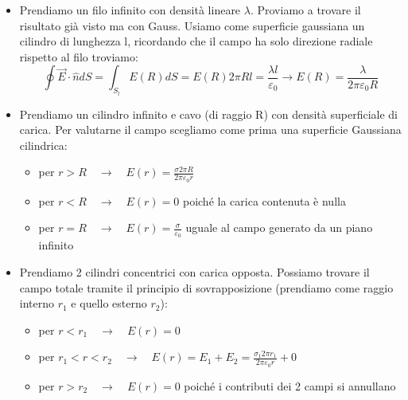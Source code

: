 \documentclass{book}
\begin{document}
\begin{itemize}
Ricordiamo che il campo di una sfera uniformemente carica all'interno è $\vec{E}(\vec{r})= \frac{\rho \vec{r}}{3 \varepsilon_0 }$, usando il principio di sovrapposizione si ha che il campo in un punto generico P è:

$$
\vec{E}(P)= \vec{E}_1(\vec{r_1}) + \vec{E}_2(\vec{r_2}) = \frac{\rho \vec{r}_1}{3 \varepsilon_0 } - 
\frac{\rho \vec{r}_2}{3 \varepsilon_0 } = \frac{\rho}{3 \varepsilon_0} (\vec{r}_1 - \vec{r}_2) = \frac{\rho}{3 \varepsilon_0} \vec{d}
$$
dove $\vec{r_1}$ e $\vec{r_2}$ sono le rispettive distanze del centro delle sfere dal punto P e $\vec{d}$ è la distanza tra i 2 centri delle sfere.
Analizziamo quindi due casi particolari:
\begin{itemize}
    \item in una situazione dove la cavità è simmetrica il campo elettrico all'interno è nullo; in quanto per sfere concentriche $\vec{d}=0$
    \item se intersechiamo 2 sfere identiche e carica opposta (i cui centri distano d), nella zona di intersezione si avrà un campo uniforme:
    $$
    \vec{E}_{int}= \frac{\rho \vec{d}}{3 \varepsilon_0}
    $$
    Mentre all'esterno vedremmo un campo di dipolo elettrico.
\end{itemize}


\item Prendiamo un filo infinito con densità lineare $\lambda$.
Proviamo a trovare il risultato già visto ma con Gauss.
Usiamo come superficie gaussiana un cilindro di lunghezza l, ricordando che il campo ha solo direzione radiale rispetto al filo troviamo:
$$
\oint \vec{E} \cdot \hat{n}dS = \int_{S_{l}} E(R) dS = E(R) 2 \pi Rl = \frac{\lambda l}{\varepsilon_0} \to E(R) = \frac{\lambda}{2 \pi \varepsilon_0 R} $$

\item Prendiamo un cilindro infinito  e cavo (di raggio R) con densità superficiale di carica. 
Per valutarne il campo scegliamo come prima una superficie Gaussiana cilindrica:
\begin{itemize}
    \item per $r > R \quad \to \quad E(r)= \frac{\sigma 2 \pi R}{2 \pi \varepsilon_0 r}  $ 
     \item per $r < R \quad \to \quad E(r)= 0 $ poiché la carica contenuta è nulla
     \item per $r = R \quad \to \quad E(r)= \frac{\sigma}{\varepsilon_0} $ uguale al campo generato da un piano infinito

\end{itemize}
\item Prendiamo 2 cilindri concentrici con carica opposta.
Possiamo trovare il campo totale tramite il principio di sovrapposizione (prendiamo come raggio interno $r_1$ e quello esterno $r_2$):
\begin{itemize}
    \item per $r<r_1 \quad \to \quad E(r)=0 $
    \item per $r_1<r<r_2 \quad \to \quad E(r)=E_1 + E_2 = \frac{\sigma_1 2 \pi r_1}{2 \pi \varepsilon_0 r} + 0 $
    \item per $r>r_2 \quad \to \quad E(r)=0 $ poiché i contributi dei 2 campi si annullano
\end{itemize}


\end{itemize}
\end{document}
